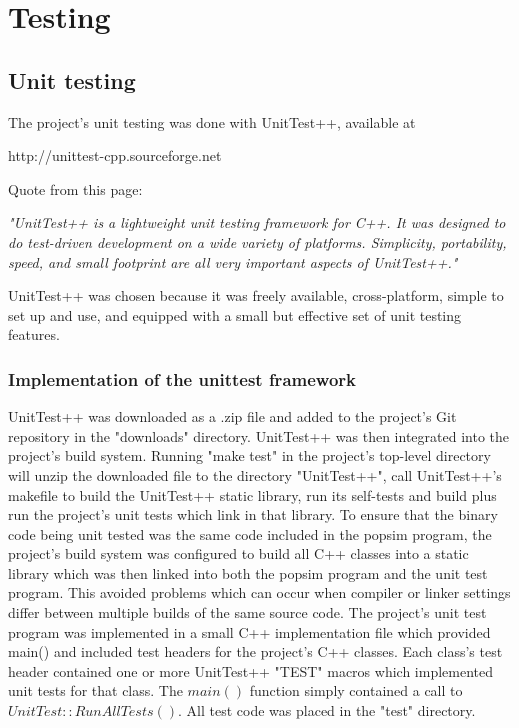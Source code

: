 \section{Testing}
\label{Testing}

\subsection{Unit testing}
\label{unittesting}

The project's unit testing was done with UnitTest++, available at
\begin{center}
 http://unittest-cpp.sourceforge.net
\end{center}
Quote from this page:
\begin{center}
 \textit{"UnitTest++ is a lightweight unit testing framework for C++.  It was designed to do test-driven development on a wide variety of platforms. Simplicity, portability, speed, and small footprint are all very important aspects of UnitTest++."}
\end{center}

UnitTest++ was chosen because it was freely available, cross-platform, simple to set up and use, and equipped with a small but effective set of unit testing features. 
\subsubsection{Implementation of the unittest framework}
UnitTest++ was downloaded as a .zip file and added to the project's Git repository in the "downloads" directory.
UnitTest++ was then integrated into the project's build system. Running "make test" in the project's top-level directory will unzip the downloaded file to the directory "UnitTest++", call UnitTest++'s makefile to build the UnitTest++ static library, run its self-tests and build plus run the project's unit tests which link in that library.
To ensure that the binary code being unit tested was the same code included in the popsim program, the project's build system was configured to build all C++ classes into a static library which was then linked into both the popsim program and the unit test program. This avoided problems which can occur when compiler or linker settings differ between multiple builds of the same source code.
The project's unit test program was implemented in a small C++ implementation file which provided main() and included test headers for the project's C++ classes.  Each class's test header contained one or more UnitTest++ "TEST" macros which implemented unit tests for that class.  The $main()$ function simply contained a call to $UnitTest::RunAllTests()$. All test code was placed in the "test" directory.

